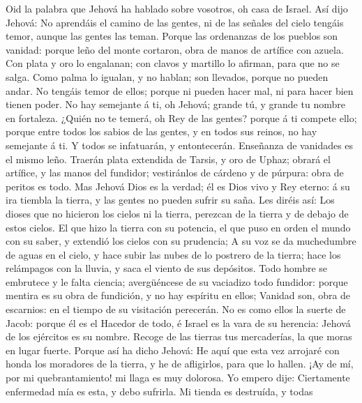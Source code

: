  Oid la palabra que Jehová ha hablado sobre vosotros, oh
casa de Israel.  Así dijo Jehová: No aprendáis el camino
de las gentes, ni de las señales del cielo tengáis temor, aunque las
gentes las teman.  Porque las ordenanzas de los pueblos
son vanidad: porque leño del monte cortaron, obra de manos de artífice
con azuela.  Con plata y oro lo engalanan; con clavos y
martillo lo afirman, para que no se salga.  Como palma lo
igualan, y no hablan; son llevados, porque no pueden andar. No tengáis
temor de ellos; porque ni pueden hacer mal, ni para hacer bien tienen
poder.  No hay semejante á ti, oh Jehová; grande tú, y
grande tu nombre en fortaleza.  ¿Quién no te temerá, oh
Rey de las gentes? porque á ti compete ello; porque entre todos los
sabios de las gentes, y en todos sus reinos, no hay semejante á ti.
 Y todos se infatuarán, y entontecerán. Enseñanza de
vanidades es el mismo leño.  Traerán plata extendida de
Tarsis, y oro de Uphaz; obrará el artífice, y las manos del fundidor;
vestiránlos de cárdeno y de púrpura: obra de peritos es todo.
 Mas Jehová Dios es la verdad; él es Dios vivo y Rey
eterno: á su ira tiembla la tierra, y las gentes no pueden sufrir su
saña.  Les diréis así: Los dioses que no hicieron los
cielos ni la tierra, perezcan de la tierra y de debajo de estos cielos.
 El que hizo la tierra con su potencia, el que puso en
orden el mundo con su saber, y extendió los cielos con su prudencia;
 A su voz se da muchedumbre de aguas en el cielo, y hace
subir las nubes de lo postrero de la tierra; hace los relámpagos con la
lluvia, y saca el viento de sus depósitos.  Todo hombre
se embrutece y le falta ciencia; avergüéncese de su vaciadizo todo
fundidor: porque mentira es su obra de fundición, y no hay espíritu en
ellos;  Vanidad son, obra de escarnios: en el tiempo de
su visitación perecerán.  No es como ellos la suerte de
Jacob: porque él es el Hacedor de todo, é Israel es la vara de su
herencia: Jehová de los ejércitos es su nombre.  Recoge
de las tierras tus mercaderías, la que moras en lugar fuerte.
 Porque así ha dicho Jehová: He aquí que esta vez
arrojaré con honda los moradores de la tierra, y he de afligirlos, para
que lo hallen.  ¡Ay de mí, por mi quebrantamiento! mi
llaga es muy dolorosa. Yo empero dije: Ciertamente enfermedad mía es
esta, y debo sufrirla.  Mi tienda es destruída, y todas
